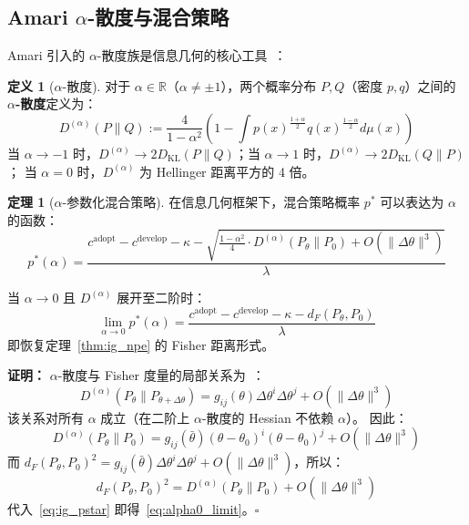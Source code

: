 \documentclass[12pt,a4paper]{article}
\theoremstyle{definition}
\newtheorem{definition}{定义}[section]
\newtheorem{theorem}{定理}[section]
\theoremstyle{remark}
\newcommand{\R}{\mathbb{R}}
\newcommand{\Fisher}{g}
\newcommand{\KL}{D_{\text{KL}}}
\newcommand{\dalpha}{D^{(\alpha)}}
\begin{document}
\subsection{Amari $\alpha$-散度与混合策略}\label{sec:alpha}

Amari 引入的 $\alpha$-散度族是信息几何的核心工具~\cite{amari1985differential,amari2016information}：

\begin{definition}[$\alpha$-散度]
对于 $\alpha \in \R$（$\alpha \neq \pm 1$），两个概率分布 $P, Q$（密度 $p, q$）之间的 \textbf{$\alpha$-散度}定义为：
\begin{equation}
    \dalpha(P \| Q) := \frac{4}{1 - \alpha^2} \left(
        1 - \int p(x)^{\frac{1+\alpha}{2}} q(x)^{\frac{1-\alpha}{2}} d\mu(x)
    \right) \label{eq:alpha_div}
\end{equation}
当 $\alpha \to -1$ 时，$\dalpha \to 2\KL(P\|Q)$；当 $\alpha \to 1$ 时，$\dalpha \to 2\KL(Q\|P)$；
当 $\alpha = 0$ 时，$\dalpha$ 为 Hellinger 距离平方的 4 倍。
\end{definition}

\begin{theorem}[$\alpha$-参数化混合策略]\label{thm:alpha_mixed}
在信息几何框架下，混合策略概率 $p^*$ 可以表达为 $\alpha$ 的函数：
\begin{equation}
    p^*(\alpha) = \frac{c^{\text{adopt}} - c^{\text{develop}} - \kappa - \sqrt{\frac{1-\alpha^2}{4} \cdot \dalpha(P_\theta \| P_0) + O(\|\Delta\theta\|^3)}}{\lambda} \label{eq:alpha_pstar}
\end{equation}

当 $\alpha \to 0$ 且 $\dalpha$ 展开至二阶时：
\begin{equation}
    \lim_{\alpha \to 0} p^*(\alpha) = \frac{c^{\text{adopt}} - c^{\text{develop}} - \kappa - d_F(P_\theta, P_0)}{\lambda} \label{eq:alpha0_limit}
\end{equation}
即恢复定理~\ref{thm:ig_npe} 的 Fisher 距离形式。

\textbf{证明：} $\alpha$-散度与 Fisher 度量的局部关系为~\cite{amari2016information}：
\begin{equation}
    \dalpha(P_\theta \| P_{\theta+\Delta\theta}) = \Fisher_{ij}(\theta) \Delta\theta^i \Delta\theta^j + O(\|\Delta\theta\|^3) \label{eq:alpha_fisher}
\end{equation}
该关系对所有 $\alpha$ 成立（在二阶上 $\alpha$-散度的 Hessian 不依赖 $\alpha$）。
因此：
\begin{equation}
    \dalpha(P_\theta \| P_0) = \Fisher_{ij}(\bar{\theta}) (\theta - \theta_0)^i (\theta - \theta_0)^j + O(\|\Delta\theta\|^3) \label{eq:alpha_fisher_expand}
\end{equation}
而 $d_F(P_\theta, P_0)^2 = \Fisher_{ij}(\bar{\theta}) \Delta\theta^i \Delta\theta^j + O(\|\Delta\theta\|^3)$，所以：
\begin{equation}
    d_F(P_\theta, P_0)^2 = \dalpha(P_\theta \| P_0) + O(\|\Delta\theta\|^3) \label{eq:df_alpha}
\end{equation}
代入~\eqref{eq:ig_pstar} 即得~\eqref{eq:alpha0_limit}。$\square$
\end{theorem}
\end{document}
